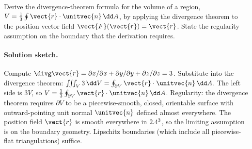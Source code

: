 \begin{exercise}
Derive the divergence-theorem formula for the volume of a region,
$V = \tfrac{1}{3} \oint \vect{r} \cdot \unitvec{n} \,\dd A$, by
applying the divergence theorem to the position vector field
$\vect{F}(\vect{r}) = \vect{r}$. State the regularity assumption on
the boundary that the derivation requires.

\paragraph{Solution sketch.} Compute $\divg\vect{r} = \partial x/
\partial x + \partial y/\partial y + \partial z/\partial z = 3$.
Substitute into the divergence theorem: $\iiint_{V} 3\,\dd V =
\oint_{\partial V}\vect{r}\cdot\unitvec{n}\,\dd A$. The left side
is $3 V$, so $V = \tfrac{1}{3}\oint_{\partial V}\vect{r}\cdot
\unitvec{n}\,\dd A$. Regularity: the divergence theorem requires
$\partial V$ to be a piecewise-smooth, closed, orientable surface
with outward-pointing unit normal $\unitvec{n}$ defined almost
everywhere. The position field $\vect{r}$ is smooth everywhere in
$2.4^{3}$, so the limiting assumption is on the boundary geometry.
Lipschitz boundaries (which include all piecewise-flat
triangulations) suffice.
\end{exercise}

